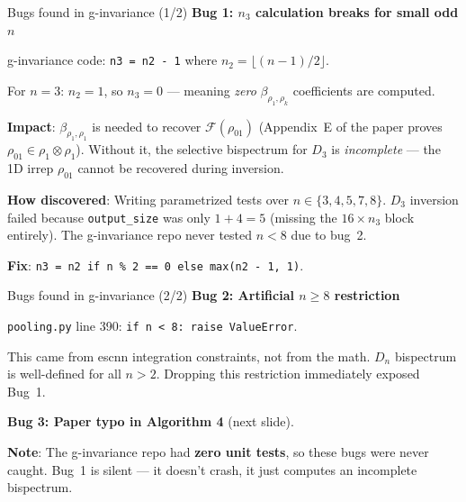 \documentclass[aspectratio=169]{beamer}
\begin{document}
\begin{frame}{Bugs found in g-invariance (1/2)}
  \textbf{Bug 1: $n_3$ calculation breaks for small odd $n$}

  \smallskip

  g-invariance code: \texttt{n3 = n2 - 1} where $n_2 = \lfloor(n{-}1)/2\rfloor$.

  For $n=3$: $n_2 = 1$, so $n_3 = 0$ --- meaning \emph{zero}
  $\beta_{\rho_1,\rho_k}$ coefficients are computed.

  \smallskip

  \textbf{Impact}: $\beta_{\rho_1,\rho_1}$ is needed to recover $\mathcal{F}(\rho_{01})$
  (Appendix~E of the paper proves $\rho_{01} \in \rho_1 \otimes \rho_1$).
  Without it, the selective bispectrum for $D_3$ is \emph{incomplete} ---
  the 1D irrep $\rho_{01}$ cannot be recovered during inversion.

  \smallskip

  \textbf{How discovered}: Writing parametrized tests over $n \in \{3, 4, 5, 7, 8\}$.
  $D_3$ inversion failed because \texttt{output\_size} was only $1 + 4 = 5$
  (missing the $16 \times n_3$ block entirely).
  The g-invariance repo never tested $n < 8$ due to bug~2.

  \smallskip

  \textbf{Fix}: \texttt{n3 = n2 if n \% 2 == 0 else max(n2 - 1, 1)}.
\end{frame}

\begin{frame}{Bugs found in g-invariance (2/2)}
  \textbf{Bug 2: Artificial $n \geq 8$ restriction}

  \smallskip

  \texttt{pooling.py} line 390: \texttt{if n < 8: raise ValueError}.

  \smallskip

  This came from escnn integration constraints, not from the math.
  $D_n$ bispectrum is well-defined for all $n > 2$. Dropping this
  restriction immediately exposed Bug~1.

  \bigskip

  \textbf{Bug 3: Paper typo in Algorithm 4} (next slide).

  \bigskip

  \textbf{Note}: The g-invariance repo had \textbf{zero unit tests},
  so these bugs were never caught. Bug~1 is silent --- it doesn't crash,
  it just computes an incomplete bispectrum.
\end{frame}
\end{document}
